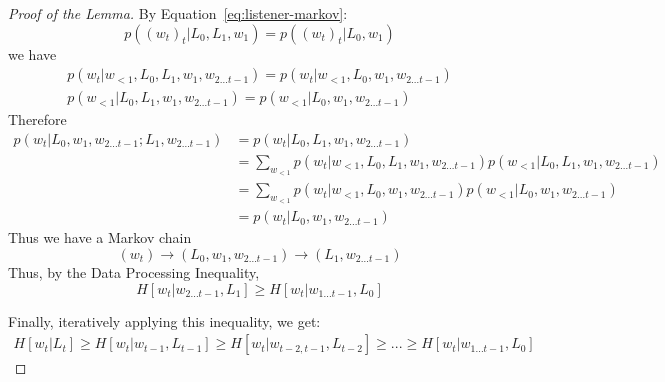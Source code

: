 	\begin{proof}[Proof of the Lemma]

By Equation~\ref{eq:listener-markov}:
	\begin{equation}
p((w_{t})_t| L_0, L_1, w_1)   = p((w_{t})_t| L_0, w_1)
	\end{equation}
we have
	\begin{align*}
p(w_t|w_{<1}, L_0, L_1, w_1, w_{2 \dots t-1}) = p(w_t|w_{<1}, L_0,  w_1, w_{2 \dots t-1}) \\
p(w_{<1}| L_0, L_1, w_1, w_{2 \dots t-1})   = p(w_{<1}| L_0, w_1, w_{2 \dots t-1})
	\end{align*}
Therefore
\begin{align*}
p(w_t|L_0, w_1, w_{2 \dots t-1}; L_1, w_{2 \dots t-1}) & = p(w_t|L_0, L_1, w_1, w_{2 \dots t-1}) \\
& = \sum_{w_{<1}} p(w_t|w_{<1}, L_0, L_1, w_1, w_{2 \dots t-1}) p(w_{<1}| L_0, L_1, w_1, w_{2 \dots t-1}) \\
&= \sum_{w_{<1}} p(w_t|w_{<1}, L_0,  w_1, w_{2 \dots t-1}) p(w_{<1}| L_0, w_1, w_{2 \dots t-1}) \\
&= p(w_t|L_0,  w_1, w_{2 \dots t-1}) 
\end{align*}
Thus we have a Markov chain
\begin{equation}
(w_t) \rightarrow (L_0, w_1, w_{2 \dots t-1})   \rightarrow   (L_1, w_{2 \dots t-1})
\end{equation}
Thus, by the Data Processing Inequality,
	\begin{equation}
H[w_t| w_{2 \dots t-1}, L_{1}] \geq H[w_t|w_{1 \dots t-1}, L_0]
	\end{equation}

Finally, iteratively applying this inequality, we get:
		\begin{align*}
		H[w_t | L_t] \geq H[w_t| w_{t-1}, L_{t-1}] \geq H[w_t| w_{t-2, t-1}, L_{t-2}] \geq ... \geq H[w_t|w_{1 \dots t-1}, L_0]
		\end{align*}

	\end{proof}
	


